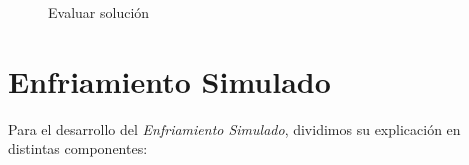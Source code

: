\begin{figure}[H]
	\centering
	\begin{minipage}{.9\linewidth}
		
		
		
		\begin{algorithm}[H] 
			
			\caption{Evaluar solución}
			\SetAlgoLined
			
			
			
		\end{algorithm} 
		
	\end{minipage}
\end{figure}









\section{Enfriamiento Simulado}

\hspace{1.5cm}Para el desarrollo del \textit{Enfriamiento Simulado}, dividimos su explicación en distintas componentes:


